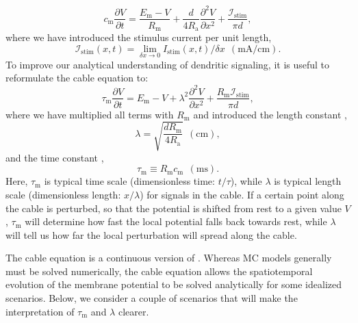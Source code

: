 \begin{equation}
c_\text{m} \frac{\partial V}{\partial t} = \frac{E_\text{m}-V}{R_\text{m}} +  \frac{d}{4 R_\text{a}}  \frac{\partial^2 V}{\partial x^2}  + \frac{\mathcal{I}_{\mathrm{stim}}}{\pi d},
\label{eq:Neuron:cable}
\end{equation}
where we have introduced the stimulus current per unit length, 
\begin{equation}
\mathcal{I}_{\mathrm{stim}}(x,t) = \lim_{\delta x \to 0} I_{\mathrm{stim}}(x,t)/\delta x \,\; (\si{\milli\ampere\per\centi\metre}). 
\label{eq:Neuron:CurrentPerUnitLength}
\end{equation}
To improve our analytical understanding of dendritic signaling, it is useful to reformulate the cable equation to:
\begin{equation}
\tau_\text{m} \frac{\partial V}{\partial t} = E_\text{m}-V +   \lambda^2  \frac{\partial^2 V}{\partial x^2}  + \frac{R_\text{m} \mathcal{I}_{\mathrm{stim}} }{\pi d},
\label{eq:Neuron:cable2}
\end{equation}
where we have multiplied all terms with $R_\text{m}$ and introduced the length constant ,
\begin{equation}
\lambda = \sqrt{\frac{d R_\text{m}}{4 R_\text{a}}} \,\; (\si{\centi\metre}), 
\label{eq:Neuron:lengthconst}
\end{equation}
and the time constant , 
\begin{equation}
\tau_\text{m} \equiv R_\text{m} c_\text{m}  \,\; (\si{\milli\second}).
\label{eq:Neuron:timeconst}
\end{equation}
Here, $\tau_\text{m}$ is typical time scale (dimensionless time: $t/\tau$), while $\lambda$  is typical length scale  (dimensionless length: $x/\lambda$) for signals in the cable. If a certain point along the cable is perturbed, so that the potential is shifted from rest to a given value $V$, $\tau_\text{m}$ will determine how fast the local potential falls back towards rest, while $\lambda$ will tell us how far the local perturbation will spread along the cable. 

The cable equation is a continuous version of . Whereas MC models generally must be solved numerically, the cable equation allows the spatiotemporal evolution of the membrane potential to be solved analytically for some idealized scenarios. Below, we consider a couple of scenarios that will  make the interpretation of $\tau_\text{m}$ and $\lambda$ clearer. 


